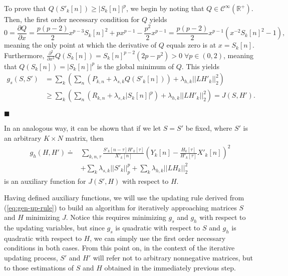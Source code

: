 \documentclass[12pt]{article}
\begin{document}
To prove that  $Q(S'_k[n])\geq |S_k[n]|^p$, we begin by noting that $Q\in\mathcal{C}^{\infty}(\mathbb{R}^+)$. Then, the first order necessary condition for $Q$ yields
%
\begin{equation}\nonumber
0 = \frac{\partial Q}{\partial x} = \frac{p(p-2)}{2}x^{p-3}S_k[n]^2+px^{p-1} -\frac{p^2}{2}x^{p-1}= \frac{p(p-2)}{2}x^{p-1}(x^{-2} S_k[n]^2-1),
\end{equation}
%
meaning the only point at which the derivative of $Q$ equals zero is at $x=S_k[n]$.   Furthermore, $\frac{\partial^2}{\partial x^2}Q( S_k[n])= S_k[n]^{p-2} (2p-p^2)>0 \;\forall p\in(0,2)$, meaning that  $Q(S_k[n]) = |S_k[n]|^p$ is the global minimum of $Q$. This yields
%
\begin{align} \nonumber
g_s(S,S') & = \sum_{k}\left(\sum_{n}(P_{k,n} +\lambda_{s,k}Q(S'_k[n]) )+\lambda_{h,k}||LH'_k||_2^2\right) \\ \nonumber
& \geq  \sum_{k}\left(\sum_{n}(R_{k,n} +\lambda_{s,k}|S_k[n]|^p)+\lambda_{h,k}||LH'_k||_2^2\right) = J(S,H').
\end{align}
\begin{flushright}
$\blacksquare$
\end{flushright}

In an analogous way, it can be shown that if we let $S=S'$ be fixed, where $S'$ is an arbitrary $K\times N$ matrix, then
%
\begin{align}\nonumber %
g_h(H,H') \doteq &\sum_{k,n,\tau} \frac{S'_k[n-\tau]H'_k[\tau]}{X'_k[n]}\left( Y_k[n]-\frac{H_k[\tau]}{H'_k[\tau]}X'_k[n] \right)^2 \nonumber\\
&+\sum_{k}\lambda_{s,k} ||S'_k||_p^p +\sum_{k} \lambda_{h,k}||LH_k||_2^2 \nonumber
\end{align}
%
is an auxiliary function for $J(S',H)$ with respect to $H$.

Having defined auxiliary functions, we will use the updating rule derived from (\ref{eq:gen-up-rule}) to build an algorithm for iteratively approaching matrices $S$ and $H$ minimizing $J$. Notice this requires minimizing $g_s$ and  $g_h$ with respect to the updating variables, but since $g_s$ is quadratic with respect to $S$  and $g_h$ is quadratic with respect to $H$, we can simply use the first order necessary conditions in both cases. From this point on, in the context of the iterative updating process,  $S'$ and $H'$ will refer not to arbitrary nonnegative matrices, but to those estimations of $S$ and $H$ obtained in the immediately previous step.
\end{document}
